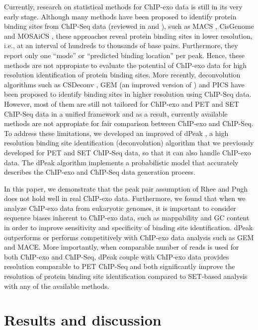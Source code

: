 \documentclass{bmcart}\usepackage[]{graphicx}\usepackage[]{color}
\begin{document}
Currently, research on statistical methods for ChIP-exo data is still
in its very early stage. Although many methods have been proposed to
identify protein binding sites from ChIP-Seq data (reviewed in
\cite{evaluation} and \cite{computation}), such as MACS \cite{macs},
CisGenome \cite{cisgenome} and MOSAiCS \cite{mosaics}, these
approaches reveal protein binding sites in lower resolution, i.e., at
an interval of hundreds to thousands of base pairs. Furthermore, they
report only one ``mode'' or ``predicted binding location'' per
peak. Hence, these methods are not appropiate to evaluate the
potential of ChIP-exo data for high resolution identification of
protein binding sites. More recently, deconvolution algorithms such as
CSDeconv \cite{csdeconv}, GEM \cite{gem} (an improved version of
\cite{gps}) and PICS \cite{pics} have been proposed to identify
binding sites in higher resolution using ChIP-Seq data. However, most
of them are still not tailored for ChIP-exo and PET and SET ChIP-Seq
data in a unified framework and as a result, currently available
methods are not appropiate for fair comparison between ChIP-exo and
ChIP-Seq. To address these limitations, we developed an improved of
dPeak \cite{dpeak}, a high resolution binding site identification
(deconvolution) algorithm that we previously developed for PET and SET
ChIP-Seq data, so that it can also handle ChIP-exo data. The dPeak
algorithm implements a probabilistic model that accurately describes
the ChIP-exo and ChIP-Seq data generation process.

In this paper, we demonstrate that the peak pair assumption of Rhee
and Pugh \cite{exo1} does not hold well in real ChIP-exo
data. Furthermore, we found that when we analyze ChIP-exo data from
eukaryotic genomes, it is important to consider sequence biases
inherent to ChIP-exo data, such as mappability and GC content in order
to improve sensitivity and specificity of binding site
identification. dPeak outperforms or performs competitively with
ChIP-exo data analysis such as GEM and MACE. More importantly, when
comparable number of reads is used for both ChIP-exo and ChIP-Seq,
dPeak couple with ChIP-exo data provides resolution comparable to PET
ChIP-Seq and both significantly improve the resolution of protein
binding site identification compared to SET-based analysis with any of
the available methods.

\section{Results and discussion}
\label{sec:results}
\end{document}
